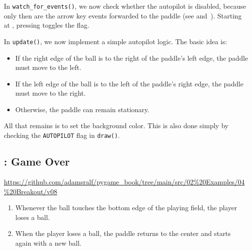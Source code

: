In \texttt{watch\_for\_events()}, we now check whether the autopilot is disabled, because only then are the arrow key events forwarded to the paddle (see  and~). Starting at , pressing  toggles the flag.


In \texttt{update()}, we now implement a simple autopilot logic. The basic idea is:
\begin{itemize}
	\item If the right edge of the ball is to the right of the paddle's left edge, the paddle must move to the left.
	\item If the left edge of the ball is to the left of the paddle's right edge, the paddle must move to the right.
	\item Otherwise, the paddle can remain stationary.
\end{itemize}


All that remains is to set the background color. This is also done simply by checking the \texttt{AUTOPILOT} flag in \texttt{draw()}.


\newpage
\subsection{: Game Over}

\begin{diskbox}
	\url{https://github.com/adamsralf/pygame_book/tree/main/src/02%20Examples/04%20Breakout/v08}
\end{diskbox}

\begin{enumerate}
	\item Whenever the ball touches the bottom edge of the playing field, the player loses a ball.
	\item When the player loses a ball, the paddle returns to the center and starts again with a new ball.
\end{enumerate}
\er

